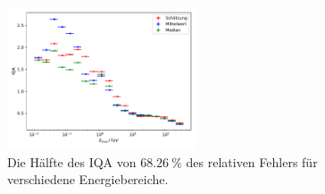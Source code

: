 \documentclass[aspectratio=1610, professionalfonts, 9pt]{beamer}
\begin{document}
  \begin{frame}
    \begin{figure}
      \includegraphics[width=0.5\textwidth]{pictures/RF_mean_resolution.pdf}
      \caption{Die Hälfte des IQA von $\SI{68,26}{\percent}$ des relativen Fehlers für verschiedene Energiebereiche.}
      \label{}
    \end{figure}
  \end{frame}
\end{document}
